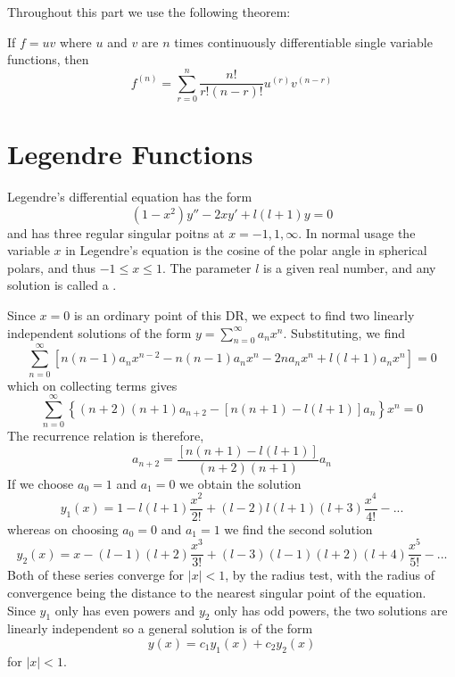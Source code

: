 \documentclass[12pt, a4paper, oneside, openright, titlepage]{book}
\begin{document}
Throughout this part we use the following theorem: 
\begin{thm}
    If $f = uv$ where $u$ and $v$ are $n$ times continuously differentiable single variable functions, then \begin{equation*}
        f^{(n)} = \sum_{r=0}^n\frac{n!}{r!(n-r)!}u^{(r)}v^{(n-r)}
    \end{equation*}
\end{thm}


\chapter{Legendre Functions}

\begin{defn}
    Legendre's differential equation has the form \begin{equation*}
        (1-x^2)y'' - 2xy' + l(l+1)y = 0
    \end{equation*}
    and has three regular singular poitns at $x = -1, 1, \infty$. In normal usage the variable $x$ in Legendre's equation is the cosine of the polar angle in spherical polars, and thus $-1\leq x \leq 1$. The parameter $l$ is a given real number, and any solution is called a .
\end{defn}

Since $x=0$ is an ordinary point of this DR, we expect to find two linearly independent solutions of the form $y = \sum_{n=0}^{\infty}a_nx^n$. Substituting, we find \begin{equation*}
    \sum_{n=0}^{\infty}[n(n-1)a_nx^{n-2} - n(n-1)a_nx^n - 2na_nx^n + l(l+1)a_nx^n] = 0
\end{equation*}
which on collecting terms gives \begin{equation*}
    \sum_{n=0}^{\infty}\left\{(n+2)(n+1)a_{n+2} - [n(n+1)-l(l+1)]a_n\right\}x^n = 0
\end{equation*}
The recurrence relation is therefore, \begin{equation*}
    a_{n+2} = \frac{[n(n+1)-l(l+1)]}{(n+2)(n+1)}a_n
\end{equation*}
If we choose $a_0 = 1$ and $a_1 = 0$ we obtain the solution \begin{equation*}
    y_1(x) = 1-l(l+1)\frac{x^2}{2!} + (l-2)l(l+1)(l+3)\frac{x^4}{4!} - ...
\end{equation*}
whereas on choosing $a_0 = 0$ and $a_1 = 1$ we find the second solution \begin{equation*}
    y_2(x) = x - (l-1)(l+2)\frac{x^3}{3!} + (l-3)(l-1)(l+2)(l+4)\frac{x^5}{5!}-...
\end{equation*}
Both of these series converge for $|x| < 1$, by the radius test, with the radius of convergence being the distance to the nearest singular point of the equation. Since $y_1$ only has even powers and $y_2$ only has odd powers, the two solutions are linearly independent so a general solution is of the form \begin{equation*}
    y(x) = c_1y_1(x) + c_2y_2(x)
\end{equation*}
for $|x| < 1$.
\end{document}
